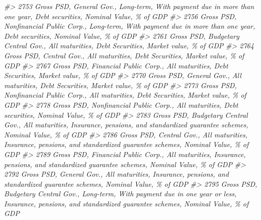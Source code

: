\documentclass[
]{bxjsbook}
\newenvironment{Shaded}{\begin{snugshade}}{\end{snugshade}}
\newcommand{\CommentTok}[1]{\textcolor[rgb]{0.56,0.35,0.01}{\textit{#1}}}
\theoremstyle{definition}
\theoremstyle{definition}
\theoremstyle{definition}
\theoremstyle{definition}
\theoremstyle{remark}
\begin{document}
\begin{Shaded}
\begin{Highlighting}[]
\CommentTok{\#\textgreater{} 2753                                                       Gross PSD, General Gov., Long{-}term, With payment due in more than one year, Debt securities, Nominal Value, \% of GDP}
\CommentTok{\#\textgreater{} 2756                                          Gross PSD, Nonfinancial Public Corp., Long{-}term, With payment due in more than one year, Debt securities, Nominal Value, \% of GDP}
\CommentTok{\#\textgreater{} 2761                                                                                 Gross PSD, Budgetary Central Gov., All maturities, Debt Securities, Market value, \% of GDP}
\CommentTok{\#\textgreater{} 2764                                                                                           Gross PSD, Central Gov., All maturities, Debt Securities, Market value, \% of GDP}
\CommentTok{\#\textgreater{} 2767                                                                                 Gross PSD, Financial Public Corp., All maturities, Debt Securities, Market value, \% of GDP}
\CommentTok{\#\textgreater{} 2770                                                                                           Gross PSD, General Gov., All maturities, Debt Securities, Market value, \% of GDP}
\CommentTok{\#\textgreater{} 2773                                                                              Gross PSD, Nonfinancial Public Corp., All maturities, Debt Securities, Market value, \% of GDP}
\CommentTok{\#\textgreater{} 2778                                                                             Gross PSD, Nonfinancial Public Corp., All maturities, Debt securities, Nominal Value, \% of GDP}
\CommentTok{\#\textgreater{} 2783                                        Gross PSD, Budgetary Central Gov., All maturities, Insurance, pensions, and standardized guarantee schemes, Nominal Value, \% of GDP}
\CommentTok{\#\textgreater{} 2786                                                  Gross PSD, Central Gov., All maturities, Insurance, pensions, and standardized guarantee schemes, Nominal Value, \% of GDP}
\CommentTok{\#\textgreater{} 2789                                        Gross PSD, Financial Public Corp., All maturities, Insurance, pensions, and standardized guarantee schemes, Nominal Value, \% of GDP}
\CommentTok{\#\textgreater{} 2792                                                  Gross PSD, General Gov., All maturities, Insurance, pensions, and standardized guarantee schemes, Nominal Value, \% of GDP}
\CommentTok{\#\textgreater{} 2795       Gross PSD, Budgetary Central Gov., Long{-}term, With payment due in one year or less, Insurance, pensions, and standardized guarantee schemes, Nominal Value, \% of GDP}

\end{Highlighting}
\end{Shaded}
\end{document}
